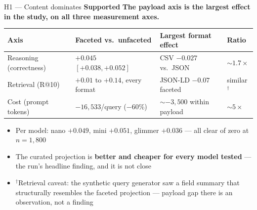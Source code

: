 \documentclass[aspectratio=169,10pt]{beamer}
\newcommand{\verdict}[1]{\textcolor{good}{\textbf{#1}}}
\begin{document}
\begin{frame}{H1 --- Content dominates \hfill \verdict{Supported}}
  \textbf{The payload axis is the largest effect in the study, on all three measurement axes.}
  \bigskip
  \begin{center}
  \renewcommand{\arraystretch}{1.4}
  \small
  \begin{tabular}{@{}llll@{}}
    \toprule
    Axis & Faceted vs.\ unfaceted & Largest format effect & Ratio \\
    \midrule
    Reasoning (correctness) & $+0.045$ $[+0.038,+0.052]$ & CSV $-0.027$ vs.\ JSON & ${\sim}1.7\times$ \\
    Retrieval (R@10) & $+0.01$ to $+0.14$, every format & JSON-LD $-0.07$ faceted & similar$^{\dagger}$ \\
    Cost (prompt tokens) & $-16{,}533$/query \;(${-}60\%$) & ${\sim}{-}3{,}500$ within payload & ${\sim}5\times$ \\
    \bottomrule
  \end{tabular}
  \end{center}
  \bigskip
  \begin{itemize}
    \item Per model: nano $+0.049$, mini $+0.051$, glimmer $+0.036$ --- all clear of zero at $n{=}1{,}800$
    \item The curated projection is \textbf{better and cheaper for every model tested} --- the
      run's headline finding, and it is not close
    \item $^{\dagger}$Retrieval caveat: the synthetic query generator saw a field summary that
      structurally resembles the faceted projection --- payload gap there is an observation, not a finding
  \end{itemize}
\end{frame}
\end{document}
